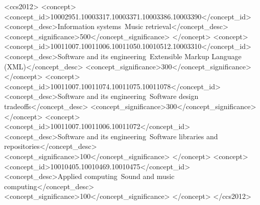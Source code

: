 \documentclass[sigconf]{acmart}
\begin{document}
%
%
\begin{CCSXML}
<ccs2012>
<concept>
<concept_id>10002951.10003317.10003371.10003386.10003390</concept_id>
<concept_desc>Information systems~Music retrieval</concept_desc>
<concept_significance>500</concept_significance>
</concept>
<concept>
<concept_id>10011007.10011006.10011050.10010512.10003310</concept_id>
<concept_desc>Software and its engineering~Extensible Markup Language (XML)</concept_desc>
<concept_significance>300</concept_significance>
</concept>
<concept>
<concept_id>10011007.10011074.10011075.10011078</concept_id>
<concept_desc>Software and its engineering~Software design tradeoffs</concept_desc>
<concept_significance>300</concept_significance>
</concept>
<concept>
<concept_id>10011007.10011006.10011072</concept_id>
<concept_desc>Software and its engineering~Software libraries and repositories</concept_desc>
<concept_significance>100</concept_significance>
</concept>
<concept>
<concept_id>10010405.10010469.10010475</concept_id>
<concept_desc>Applied computing~Sound and music computing</concept_desc>
<concept_significance>100</concept_significance>
</concept>
</ccs2012>
\end{CCSXML}



\maketitle





\end{document}
